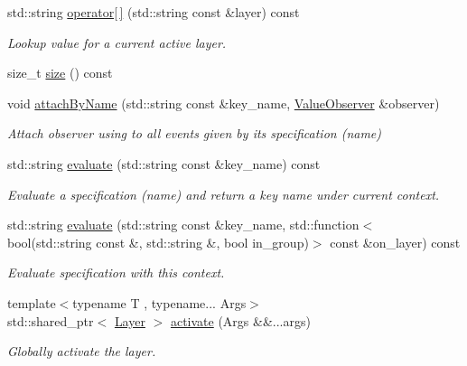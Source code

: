 \begin{DoxyCompactItemize}
\item 
std\+::string \hyperlink{classkdb_1_1Context_a331463d2eec8d2a5fdb8ffe4bfc181f6}{operator\mbox{[}$\,$\mbox{]}} (std\+::string const \&layer) const 
\begin{DoxyCompactList}\small\item\em Lookup value for a current active layer. \end{DoxyCompactList}\item 
size\+\_\+t \hyperlink{classkdb_1_1Context_add39417df86eb963a1f04a8812c51917}{size} () const 
\item 
void \hyperlink{classkdb_1_1Context_afcbfe897ee36eb4fee23640051122e54}{attach\+By\+Name} (std\+::string const \&key\+\_\+name, \hyperlink{classkdb_1_1ValueObserver}{Value\+Observer} \&observer)
\begin{DoxyCompactList}\small\item\em Attach observer using to all events given by its specification (name) \end{DoxyCompactList}\item 
std\+::string \hyperlink{classkdb_1_1Context_a130675fbe20f1b20eaa462ec6a9fe98e}{evaluate} (std\+::string const \&key\+\_\+name) const 
\begin{DoxyCompactList}\small\item\em Evaluate a specification (name) and return a key name under current context. \end{DoxyCompactList}\item 
std\+::string \hyperlink{classkdb_1_1Context_a0687e0df9fbb3e2670fb45f1f9afdfc9}{evaluate} (std\+::string const \&key\+\_\+name, std\+::function$<$ bool(std\+::string const \&, std\+::string \&, bool in\+\_\+group)$>$ const \&on\+\_\+layer) const 
\begin{DoxyCompactList}\small\item\em Evaluate specification with this context. \end{DoxyCompactList}\item 
{\footnotesize template$<$typename T , typename... Args$>$ }\\std\+::shared\+\_\+ptr$<$ \hyperlink{classkdb_1_1Layer}{Layer} $>$ \hyperlink{classkdb_1_1Context_a28b78596e359631e452d768b7861fb84}{activate} (Args \&\&...args)
\begin{DoxyCompactList}\small\item\em Globally activate the layer. \end{DoxyCompactList}\end{DoxyCompactItemize}


